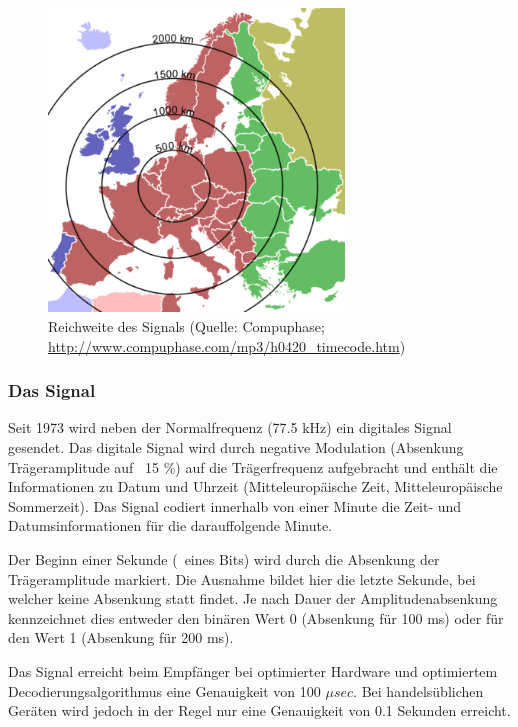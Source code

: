 \begin{figure}
  \begin{center}
    \includegraphics[width=0.7\textwidth]{./images/Analyse/DCF77_Reichweite.png}
  \end{center}
  \caption[Reichweite des Signals]{Reichweite des Signals (Quelle: Compuphase; 
  \url{http://www.compuphase.com/mp3/h0420_timecode.htm})} 
\end{figure}

\subsubsection{Das Signal}
Seit 1973 wird neben der Normalfrequenz (77.5 kHz) ein digitales Signal gesendet. Das digitale Signal wird durch negative Modulation (Absenkung Trägeramplitude auf ~15 \%) auf die Trägerfrequenz aufgebracht und enthält die Informationen zu Datum und Uhrzeit (Mitteleuropäische Zeit, Mitteleuropäische Sommerzeit). Das Signal codiert innerhalb von einer Minute die Zeit- und Datumsinformationen für die darauffolgende Minute.

Der Beginn einer Sekunde (~eines Bits) wird durch die Absenkung der Trägeramplitude markiert. Die Ausnahme bildet hier die letzte Sekunde, bei welcher keine Absenkung statt findet. Je nach Dauer der Amplitudenabsenkung kennzeichnet dies entweder den binären Wert 0 (Absenkung für 100 ms) oder für den Wert 1 (Absenkung für 200 ms).

Das Signal erreicht beim Empfänger bei optimierter Hardware und optimiertem Decodierungsalgorithmus eine Genauigkeit von 100 ${\mu}sec$. Bei handelsüblichen Geräten wird jedoch in der Regel nur eine Genauigkeit von 0.1 Sekunden erreicht.


